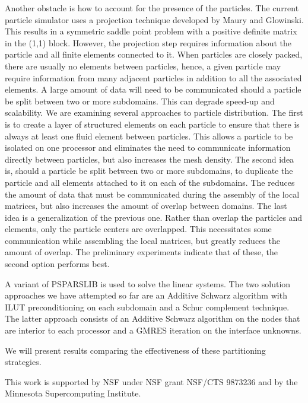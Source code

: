 \documentclass[11pt]{article}
\begin{document}
Another obstacle is how to account for the presence of the particles.
The current particle simulator uses a projection technique developed
by Maury and Glowinski.  This results in a symmetric saddle point 
problem with a positive definite matrix in the (1,1) block.  However, 
the projection step requires information about the particle and
all finite elements connected to it.  When particles are closely packed,
there are usually no elements between particles, hence, a given particle 
may require information from many adjacent particles in addition to
all the associated elements.  A large amount of data will need
to be communicated should a particle be split between two or 
more subdomains.  This can degrade speed-up and scalability.
We are examining several approaches to particle distribution.  The first is to
create a layer of structured elements on each particle to ensure that
there is always at least one fluid element between particles.
This allows a particle to be isolated on one processor and eliminates the need 
to communicate information directly between particles, but also 
increases the mesh density.  The second idea is, 
should a particle be split between two or more subdomains, to duplicate 
the particle and all elements attached to it on each of the subdomains.
The reduces the amount of data that must be communicated during the
assembly of the local matrices, but also increases the amount of 
overlap between domains.
The last idea is a generalization of the previous one.  Rather than overlap
the particles and elements, only the particle centers are overlapped.  This
necessitates some communication while assembling the local matrices,
but greatly reduces the amount of overlap.  
The preliminary experiments indicate that of these, the second option
performs best.





A variant of PSPARSLIB is used to solve the linear systems.  The two solution
approaches we have attempted so far are an Additive Schwarz algorithm
with ILUT preconditioning on each subdomain and a Schur complement
technique.  The latter approach consists of an Additive Schwarz
algorithm on the nodes that are interior to each processor 
and a GMRES iteration on the interface unknowns.  





We will present results comparing the effectiveness of these 
partitioning strategies. 





This work is supported by NSF under NSF grant NSF/CTS 9873236 and
by the Minnesota Supercomputing Institute.
\end{document}
